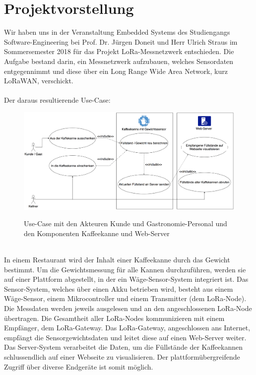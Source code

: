 

\chapter{Projektvorstellung}
Wir haben uns in der Veranstaltung Embedded Systems des Studiengangs Software-Engineering bei Prof. Dr. Jürgen Doneit und Herr Ulrich Straus im Sommersemester 2018 für das Projekt LoRa-Messnetzwerk entschieden. Die Aufgabe bestand darin, ein Messnetzwerk aufzubauen, welches Sensordaten entgegennimmt und diese über ein Long Range Wide Area Network, kurz LoRaWAN, verschickt.\\
\\
Der daraus resultierende Use-Case:
\begin{figure}[ht]
    \center
    \includegraphics[width=15cm]{Bilder/usecase-1.png}\\
    \caption{Use-Case mit den Akteuren Kunde und Gastronomie-Personal und den Komponenten Kaffeekanne und Web-Server}
    \label{fig:Use-Case}
\end{figure}
\\
In einem Restaurant wird der Inhalt einer Kaffeekanne durch das Gewicht bestimmt. Um die Gewichtsmessung für alle Kannen durchzuführen, werden sie auf einer Plattform abgestellt, in der ein Wäge-Sensor-System integriert ist. Das Sensor-System, welches über einen Akku betrieben wird, besteht aus einem Wäge-Sensor, einem Mikrocontroller und einem Transmitter (dem LoRa-Node). Die Messdaten werden jeweils ausgelesen und an den angeschlossenen LoRa-Node übertragen. Die Gesamtheit aller LoRa-Nodes kommunizieren mit einem Empfänger, dem LoRa-Gateway. Das LoRa-Gateway, angeschlossen ans Internet, empfängt die Sensorgewichtsdaten und leitet diese auf einen Web-Server weiter. Das Server-System verarbeitet die Daten, um die Füllstände der Kaffeekannen schlussendlich auf einer Webseite zu visualisieren. Der plattformübergreifende Zugriff über diverse Endgeräte ist somit möglich.


